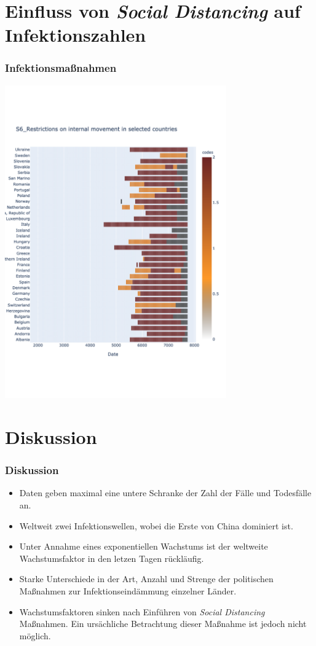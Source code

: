 \documentclass{beamer}
\begin{document}
\section{Einfluss von \emph{Social Distancing} auf Infektionszahlen}
\begin{frame}
	\frametitle{Infektionsmaßnahmen}
	\centering
	\includegraphics[width = 270pt]{responses_countries}
\end{frame}
\section{Diskussion}
\begin{frame}
	\frametitle{Diskussion}
	\begin{itemize}
		\item Daten geben maximal eine untere Schranke der Zahl der Fälle und Todesfälle an.
		\item Weltweit zwei Infektionswellen, wobei die Erste von China dominiert ist.
		\item Unter Annahme eines exponentiellen Wachstums ist der weltweite Wachstumsfaktor in den letzen Tagen rückläufig.
		\item Starke Unterschiede in der Art, Anzahl und Strenge der politischen Maßnahmen zur Infektionseindämmung einzelner Länder.
		\item Wachstumsfaktoren sinken nach Einführen von \emph{Social Distancing} Maßnahmen. Ein ursächliche Betrachtung dieser Maßnahme ist jedoch nicht möglich.
	\end{itemize}
\end{frame}
\end{document}
